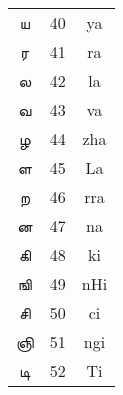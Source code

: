 \documentclass[a4paper,10pt]{article}
\begin{document}
\begin{table}[!t]
\begin{tabular}{ccc}
\t{ ய } & 40 & ya \\
\t{ ர } & 41 & ra \\
\t{ ல } & 42 & la \\
\t{ வ } & 43 & va \\
\t{ ழ } & 44 & zha \\
\t{ ள } & 45 & La \\
\t{ ற } & 46 & rra \\
\t{ ன } & 47 & na \\
\t{ கி } & 48 & ki \\
\t{ ஙி } & 49 & nHi \\
\t{ சி } & 50 & ci \\
\t{ ஞி } & 51 & ngi \\
\t{ டி } & 52 & Ti \\


\bottomrule
\end{tabular}
\end{table}
\end{document}
